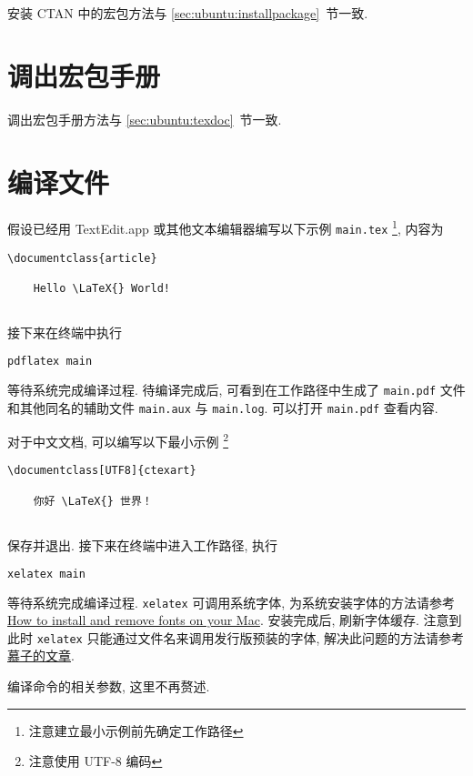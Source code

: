 安装 CTAN 中的宏包方法与 \ref{sec:ubuntu:installpackage}~节一致.

\section{调出宏包手册}

调出宏包手册方法与 \ref{sec:ubuntu:texdoc}~节一致.

\section{编译文件}

假设已经用 TextEdit.app 或其他文本编辑器编写以下示例 \texttt{main.tex}%
\footnote{注意建立最小示例前先确定工作路径},
内容为
\begin{lstlisting}[language = {[LaTeX]TeX}]
  \documentclass{article}
  
    Hello \LaTeX{} World!
  
\end{lstlisting}
接下来在\textsf{终端}中执行
\begin{lstlisting}[language=bash]
  pdflatex main
\end{lstlisting}
等待系统完成编译过程. 
待编译完成后, 可看到在工作路径中生成了 \texttt{main.pdf}
文件和其他同名的辅助文件 \texttt{main.aux} 与 \texttt{main.log}.
可以打开 \texttt{main.pdf} 查看内容.

对于中文文档, 可以编写以下最小示例%
\footnote{注意使用 UTF-8 编码}%
\begin{lstlisting}[language={[LaTeX]TeX}]
  \documentclass[UTF8]{ctexart}
  
    你好 \LaTeX{} 世界！
  
\end{lstlisting}
保存并退出.
接下来在\textsf{终端}中进入工作路径,
执行
\begin{lstlisting}[language=bash]
  xelatex main
\end{lstlisting}
等待系统完成编译过程.
\texttt{xelatex} 可调用系统字体,
为系统安装字体的方法请参考
\href{https://support.apple.com/en-us/HT201749}{How to install and remove fonts on your Mac}.
安装完成后, 刷新字体缓存.
注意到此时 \texttt{xelatex} 只能通过文件名来调用发行版预装的字体,
解决此问题的方法请参考%
\href{https://zhuanlan.zhihu.com/p/59774395}{慕子的文章}.

编译命令的相关参数, 这里不再赘述.
